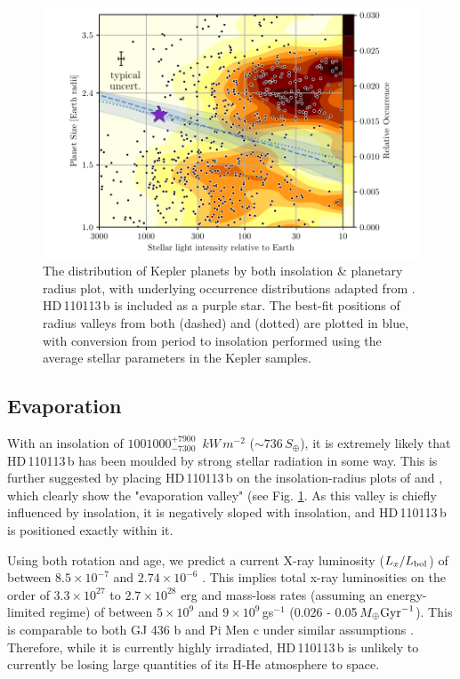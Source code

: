 \documentclass[fleqn,usenatbib]{mnras}
\newcommand{\TSin}{ $ 1001000^{+7900}_{-7300} $ }
\newcommand{\Tplanet}{HD\,110113\,b}
\begin{document}
\begin{figure}
	\includegraphics[width=\columnwidth, trim={0.8cm 0.5cm 1.05cm 0.2cm}]{Insolation_TOI755}
    \caption{The distribution of Kepler planets by both insolation \& planetary radius plot, with underlying occurrence distributions adapted from \citep{martinez2019spectroscopic}. \Tplanet{} is included as a purple star. The best-fit positions of radius valleys from both \citet{martinez2019spectroscopic} (dashed) and \citet{van2018asteroseismic} (dotted) are plotted in blue, with conversion from period to insolation performed using the average stellar parameters in the Kepler samples.\label{fig:insolation}
    }
\end{figure}

\subsection{Evaporation}\label{sect:evap}
With an insolation of \TSin{}\,$kW$\,$m^{-2}$ ($\sim736\,S_\oplus$), it is extremely likely that \Tplanet{} has been moulded by strong stellar radiation in some way.
This is further suggested by placing \Tplanet{} on the insolation-radius plots of \citet{fulton2017california} and \citet{martinez2019spectroscopic}, which clearly show the "evaporation valley" (see Fig. \ref{fig:insolation}.
As this valley is chiefly influenced by insolation, it is negatively sloped with insolation, and \Tplanet{} is positioned exactly within it.

Using both rotation and age, we predict a current X-ray luminosity ($L_x/L_{\rm bol}$) of between $8.5\times10^{-7}$ \citep[with Prot;][]{wright2018stellar} and $2.74\times10^{-6}$ \citep[with age;][]{jackson2012coronal}.
This implies total x-ray luminosities on the order of $3.3\times10^{27}$ to $2.7\times10^{28}$ erg and mass-loss rates (assuming an energy-limited regime) of between $5\times10^{9}$ and $9\times10^{9}$\,gs$^{-1}$ (0.026 - 0.05\,$M_\oplus {\rm Gyr}^{-1}$).
This is comparable to both GJ 436 b and Pi Men c under similar assumptions \citep{king2019xuv}.
Therefore, while it is currently highly irradiated, \Tplanet{} is unlikely to currently be losing large quantities of its H-He atmosphere to space.
\end{document}
